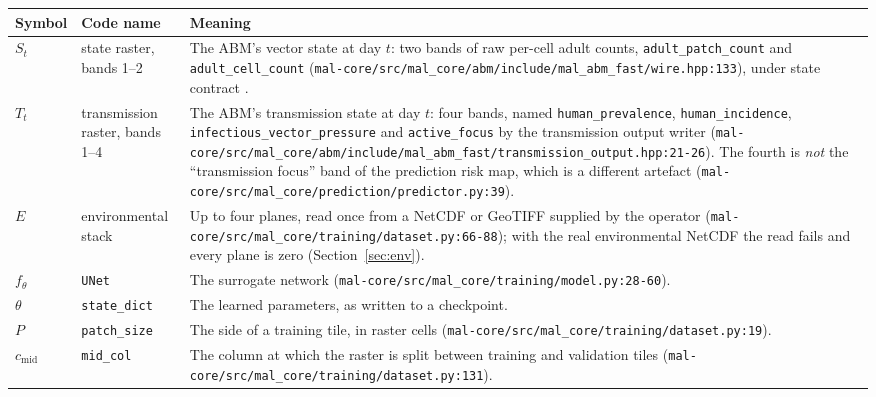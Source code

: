 \documentclass[11pt,a4paper]{article}
\newcommand{\codex}[1]{\texttt{#1}}
\newcommand{\StateContract}{\mskey{contracts.cogs_state}}
\begin{document}
\begin{center}
\begin{longtable}{@{}lp{3.4cm}p{9.0cm}@{}}
\toprule
Symbol & Code name & Meaning \\
\midrule
\endhead
\(S_t\) & state raster, bands 1--2 & The ABM's vector state at day \(t\): two bands of raw per-cell adult counts, \codex{adult\_\allowbreak{}patch\_\allowbreak{}count} and \codex{adult\_\allowbreak{}cell\_\allowbreak{}count} (\codex{mal-core/\allowbreak{}src/\allowbreak{}mal\_\allowbreak{}core/\allowbreak{}abm/\allowbreak{}include/\allowbreak{}mal\_\allowbreak{}abm\_\allowbreak{}fast/\allowbreak{}wire.hpp:133}), under state contract \StateContract. \\
\(T_t\) & transmission raster, bands 1--4 & The ABM's transmission state at day \(t\): four bands, named \codex{human\_\allowbreak{}prevalence}, \codex{human\_\allowbreak{}incidence}, \codex{infectious\_\allowbreak{}vector\_\allowbreak{}pressure} and \codex{active\_\allowbreak{}focus} by the transmission output writer (\codex{mal-core/\allowbreak{}src/\allowbreak{}mal\_\allowbreak{}core/\allowbreak{}abm/\allowbreak{}include/\allowbreak{}mal\_\allowbreak{}abm\_\allowbreak{}fast/\allowbreak{}transmission\_\allowbreak{}output.hpp:21-26}). The fourth is \emph{not} the ``transmission focus'' band of the prediction risk map, which is a different artefact (\codex{mal-core/\allowbreak{}src/\allowbreak{}mal\_\allowbreak{}core/\allowbreak{}prediction/\allowbreak{}predictor.py:39}). \\
\(E\) & environmental stack & Up to four planes, read once from a NetCDF or GeoTIFF supplied by the operator (\codex{mal-core/\allowbreak{}src/\allowbreak{}mal\_\allowbreak{}core/\allowbreak{}training/\allowbreak{}dataset.py:66-88}); with the real environmental NetCDF the read fails and every plane is zero (Section~\ref{sec:env}). \\
\(f_\theta\) & \codex{UNet} & The surrogate network (\codex{mal-core/\allowbreak{}src/\allowbreak{}mal\_\allowbreak{}core/\allowbreak{}training/\allowbreak{}model.py:28-60}). \\
\(\theta\) & \codex{state\_\allowbreak{}dict} & The learned parameters, as written to a checkpoint. \\
\(P\) & \codex{patch\_\allowbreak{}size} & The side of a training tile, in raster cells (\codex{mal-core/\allowbreak{}src/\allowbreak{}mal\_\allowbreak{}core/\allowbreak{}training/\allowbreak{}dataset.py:19}). \\
\(c_{\mathrm{mid}}\) & \codex{mid\_\allowbreak{}col} & The column at which the raster is split between training and validation tiles (\codex{mal-core/\allowbreak{}src/\allowbreak{}mal\_\allowbreak{}core/\allowbreak{}training/\allowbreak{}dataset.py:131}). \\

\end{longtable}
\end{center}
\end{document}
